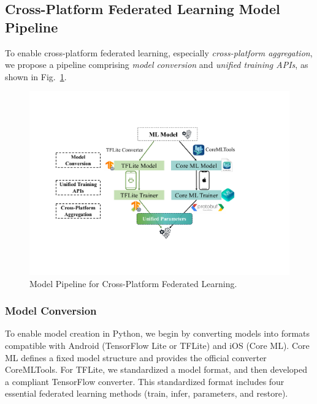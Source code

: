 \subsection{Cross-Platform Federated Learning Model Pipeline}
\label{sec:pipeline}

To enable cross-platform federated learning,
especially \textit{cross-platform aggregation},
we propose a pipeline comprising
\textit{model conversion} and
\textit{unified training APIs},
as shown in Fig.~\ref{fig:pipeline}.

\begin{figure}\begin{center}
    \includegraphics[width=\linewidth]{model_pipeline.pdf}
    \caption{\fedkit Model Pipeline for Cross-Platform Federated Learning.}
    \label{fig:pipeline}
\end{center}\end{figure}

\subsubsection{Model Conversion}
To enable model creation in Python,
we begin by converting models into formats compatible with
Android (TensorFlow Lite or TFLite) and iOS (Core ML).
Core ML defines a fixed model structure and provides
the official converter CoreMLTools.
For TFLite, we standardized a model format, and then
developed a compliant TensorFlow converter.
This standardized format includes
four essential federated learning methods
(\textsf{train}, \textsf{infer}, \textsf{parameters},
and \textsf{restore}).

